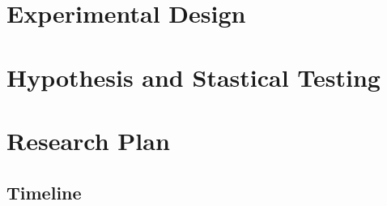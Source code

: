 \documentclass[conference]{IEEEtran}
\begin{document}
\section{Experimental Design}

\section{Hypothesis and Stastical Testing}

\section{Research Plan}

\subsection{Timeline}

\clearpage




\end{document}
